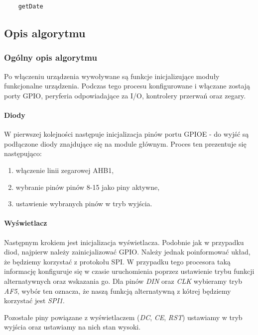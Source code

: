 \documentclass{article}
\begin{document}
\begin{lstlisting}
    getDate
\end{lstlisting}


\subsection{Opis algorytmu}

\subsubsection{Ogólny opis algorytmu}
Po włączeniu urządzenia wywoływane są funkcje inicjalizujące moduły funkcjonalne
urządzenia. Podczas tego procesu konfigurowane i włączane zostają porty GPIO,
peryferia odpowiadające za I/O, kontrolery przerwań oraz zegary.

\paragraph{Diody}
W pierwszej kolejności następuje inicjalizacja pinów portu GPIOE - do wyjść
są podłączone diody znajdujące się na module głównym. Proces ten prezentuje się
następująco:

\begin{enumerate}
    \item włączenie linii zegarowej AHB1,
    \item wybranie pinów pinów 8-15 jako piny aktywne,
    \item ustawienie wybranych pinów w tryb wyjścia.
\end{enumerate}

\paragraph{Wyświetlacz}
Następnym krokiem jest inicjalizacja wyświetlacza. Podobnie jak w przypadku diod, najpierw
należy zainicjalizować GPIO. Należy jednak poinformować układ, że 
będziemy korzystać z protokołu SPI. W przypadku tego procesora 
taką informację konfiguruje się w czasie uruchomienia poprzez ustawienie
trybu funkcji alternatywnych oraz wskazania go.
Dla pinów \emph{DIN} oraz \emph{CLK} wybieramy tryb \emph{AF5}, wybór ten
oznacza, że naszą funkcją alternatywną z kótrej będziemy korzystać jest \emph{SPI1}.

Pozostałe piny powiązane z wyświetlaczem (\emph{DC}, \emph{CE}, \emph{RST})
ustawiamy w tryb wyjścia oraz ustawiamy na nich stan wysoki.
\end{document}
